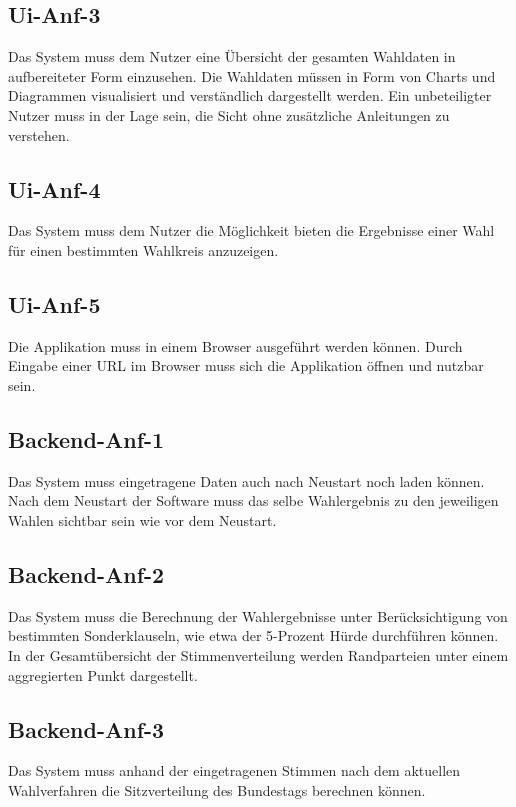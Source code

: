 \documentclass[a4paper]{scrreprt}
\begin{document}
\subsection{Ui-Anf-3}

Das System muss dem Nutzer eine Übersicht der gesamten Wahldaten in aufbereiteter Form einzusehen. Die Wahldaten  müssen in Form von Charts und Diagrammen visualisiert und verständlich dargestellt werden. Ein unbeteiligter Nutzer muss in der Lage sein, die Sicht ohne zusätzliche Anleitungen zu verstehen.

\subsection{Ui-Anf-4}

Das System muss dem Nutzer die Möglichkeit bieten die Ergebnisse einer Wahl für einen bestimmten Wahlkreis anzuzeigen. 

\subsection{Ui-Anf-5}

Die Applikation muss in einem Browser ausgeführt werden können. Durch Eingabe einer URL im Browser muss sich die Applikation öffnen und nutzbar sein.

\subsection{Backend-Anf-1}

Das System muss eingetragene Daten auch nach Neustart noch laden können. Nach dem Neustart der Software muss das selbe Wahlergebnis zu den jeweiligen Wahlen sichtbar sein wie vor dem Neustart. 

\subsection{Backend-Anf-2}

Das System muss die Berechnung der Wahlergebnisse unter Berücksichtigung von bestimmten Sonderklauseln, wie etwa der 5-Prozent Hürde durchführen können. In der Gesamtübersicht der Stimmenverteilung werden Randparteien unter einem aggregierten Punkt dargestellt.  

\subsection{Backend-Anf-3}

Das System muss anhand der eingetragenen Stimmen nach dem aktuellen Wahlverfahren die Sitzverteilung des Bundestags berechnen können.
\end{document}
